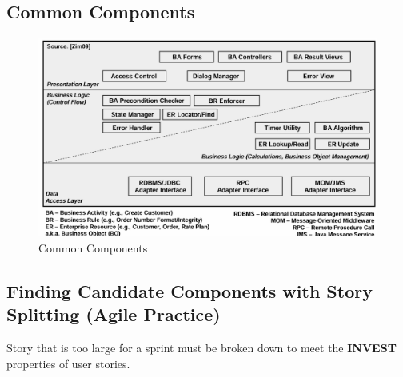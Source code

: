 \documentclass[../Main.tex]{subfiles}
\begin{document}
\subsection{Common Components}
\begin{figure}[H]
    \centering
    \includegraphics[angle=90,height=1.2\textwidth]{Images/commoncomponents.png}
    \caption{Common Components}
\end{figure}
\newpage

\subsection{Finding Candidate Components with Story Splitting (Agile Practice)}
Story that is too large for a sprint must be broken down to meet the \textbf{INVEST} properties of user stories.

\end{document}
